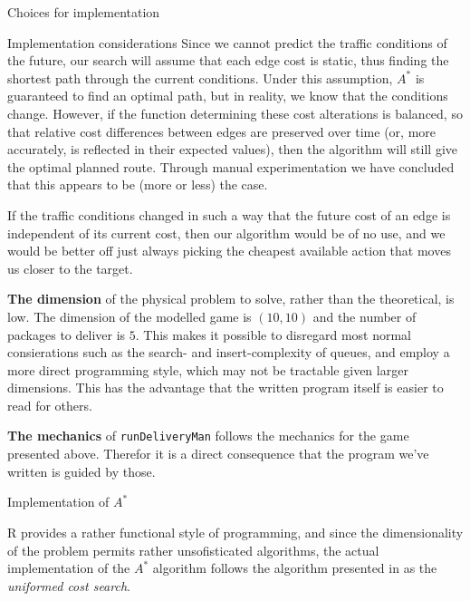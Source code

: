 \begin{subsection}{Choices for implementation}
\begin{subsubsection}{Implementation considerations}
	  Since we cannot predict the traffic conditions of the future, our search will assume that each edge cost is static, thus finding the shortest path through the current conditions. Under this assumption, $A^*$ is guaranteed to find an optimal path, but in reality, we know that the conditions change. However, if the function determining these cost alterations is balanced, so that relative cost differences between edges are preserved over time (or, more accurately, is reflected in their expected values), then the algorithm will still give the optimal planned route. Through manual experimentation we have concluded that this appears to be (more or less) the case.
	
	  If the traffic conditions changed in such a way that the future cost of an edge is independent of its current cost, then our algorithm would be of no use, and we would be better off just always picking the cheapest available action that moves us closer to the target.

      \textbf{The dimension} of the physical problem to solve, rather than the theoretical, is low. The dimension of the modelled game is $(10, 10)$ and the number of packages to deliver is $5$. This makes it possible to disregard most normal consierations such as the search- and insert-complexity of queues, and employ a more direct programming style, which may not be tractable given larger dimensions. This has the advantage that the written program itself is easier to read for others. 
	  
    \end{subsubsection}

    \textbf{The mechanics} of \texttt{runDeliveryMan} follows the mechanics for the game presented above. Therefor it is a direct consequence that the program we've written is guided by those. 

    \begin{subsubsection}{Implementation of $A^*$ }

      R provides a rather functional style of programming, and since the dimensionality of the problem permits rather unsofisticated algorithms, the actual implementation of the $A^*$ algorithm follows the algorithm presented in \cite{rn} as the \textit{uniformed cost search}.

    \end{subsubsection}

  \end{subsection}